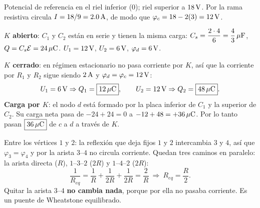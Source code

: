\begin{center}\circSdosQdiecinueve\end{center}
Potencial de referencia en el riel inferior ($0$); riel superior a $18\,\mathrm{V}$. Por la rama resistiva circula $I=18/9=2.0\,\mathrm{A}$, de modo que $\varphi_c=18-2(3)=12\,\mathrm{V}$.

\textbf{$K$ abierto}: $C_1$ y $C_2$ están en serie y tienen la misma carga: $C_s=\dfrac{2\cdot4}{6}=\dfrac43\,\mathrm{\mu F}$, $Q=C_s\mathcal{E}=24\,\mathrm{\mu C}$. $U_1=12\,\mathrm{V}$, $U_2=6\,\mathrm{V}$, $\varphi_d=6\,\mathrm{V}$.

\textbf{$K$ cerrado}: en régimen estacionario no pasa corriente por $K$, así que la corriente por $R_1$ y $R_2$ sigue siendo $2\,\mathrm{A}$ y $\varphi_d=\varphi_c=12\,\mathrm{V}$:
\[
U_1=6\,\mathrm{V}\Rightarrow Q_1=\boxed{12\,\mathrm{\mu C}},\qquad U_2=12\,\mathrm{V}\Rightarrow Q_2=\boxed{48\,\mathrm{\mu C}}.
\]
\textbf{Carga por $K$}: el nodo $d$ está formado por la placa inferior de $C_1$ y la superior de $C_2$. Su carga neta pasa de $-24+24=0$ a $-12+48=+36\,\mathrm{\mu C}$. Por lo tanto pasan $\boxed{36\,\mathrm{\mu C}}$ de $c$ a $d$ a través de $K$.

\begin{center}\circTetraedro\end{center}
Entre los vértices $1$ y $2$: la reflexión que deja fijos $1$ y $2$ intercambia $3$ y $4$, así que $\varphi_3=\varphi_4$ y por la arista $3$--$4$ no circula corriente. Quedan tres caminos en paralelo: la arista directa ($R$), $1$--$3$--$2$ ($2R$) y $1$--$4$--$2$ ($2R$):
\[
\frac1{R_{eq}}=\frac1R+\frac1{2R}+\frac1{2R}=\frac2R\ \Rightarrow\ \boxed{R_{eq}=\frac R2}.
\]
Quitar la arista $3$--$4$ \textbf{no cambia nada}, porque por ella no pasaba corriente. Es un puente de Wheatstone equilibrado.
